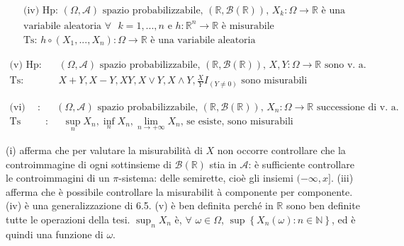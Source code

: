 \documentclass{article}
\begin{document}
\begin{gather*}
\text{(iv) Hp: }\left( \Omega ,\mathcal{A}\right) \text{ spazio
probabilizzabile, }\left( 
\mathbb{R}
,\mathcal{B}\left( 
\mathbb{R}
\right) \right) \text{, }X_{k}:\Omega \rightarrow 
\mathbb{R}
\text{ \`{e} una} \\
\text{variabile aleatoria }\forall \text{ }k=1,...,n\text{ e }h:%
\mathbb{R}
^{n}\rightarrow 
\mathbb{R}
\text{ \`{e} misurabile} \\
\text{Ts: }h\circ \left( X_{1},...,X_{n}\right) :\Omega \rightarrow 
\mathbb{R}
\text{ \`{e} una variabile aleatoria}
\end{gather*}

\begin{eqnarray*}
\text{(v) Hp}\text{: } &&\left( \Omega ,\mathcal{A}\right) \text{ spazio
probabilizzabile, }\left( 
\mathbb{R}
,\mathcal{B}\left( 
\mathbb{R}
\right) \right) \text{, }X,Y:\Omega \rightarrow 
\mathbb{R}
\text{ sono v. a.} \\
\text{Ts}\text{: } &&X+Y,X-Y,XY,X\vee Y,X\wedge Y,\frac{X}{Y}I_{\left( Y\neq
0\right) }\text{ sono misurabili}
\end{eqnarray*}

\begin{eqnarray*}
\text{(vi) Hp}\text{: } &&\left( \Omega ,\mathcal{A}\right) \text{ spazio
probabilizzabile, }\left( 
\mathbb{R}
,\mathcal{B}\left( 
\mathbb{R}
\right) \right) \text{, }X_{n}:\Omega \rightarrow 
\mathbb{R}
\text{ successione di v. a.} \\
\text{Ts} &\text{:}&\text{ }\sup_{n}X_{n},\inf_{n}X_{n},\lim_{n\rightarrow
+\infty }X_{n}\text{, se esiste, sono misurabili}
\end{eqnarray*}

(i) afferma che per valutare la misurabilit\`{a} di $X$ non occorre
controllare che la controimmagine di ogni sottinsieme di $\mathcal{B}\left( 
\mathbb{R}
\right) $ stia in $\mathcal{A}$: \`{e} sufficiente controllare le
controimmagini di un $\pi $-sistema: delle semirette, cio\`{e} gli insiemi $%
(-\infty ,x]$. (iii) afferma che \`{e} possibile controllare la misurabilit%
\`{a} componente per componente. (iv) \`{e} una generalizzazione di 6.5. (v) 
\`{e} ben definita perch\'{e} in $%
\mathbb{R}
$ sono ben definite tutte le operazioni della tesi. $\sup_{n}X_{n}$ \`{e}, $%
\forall $ $\omega \in \Omega $, $\sup \left\{ X_{n}\left( \omega \right)
:n\in 
\mathbb{N}
\right\} $, ed \`{e} quindi una funzione di $\omega $.
\end{document}
